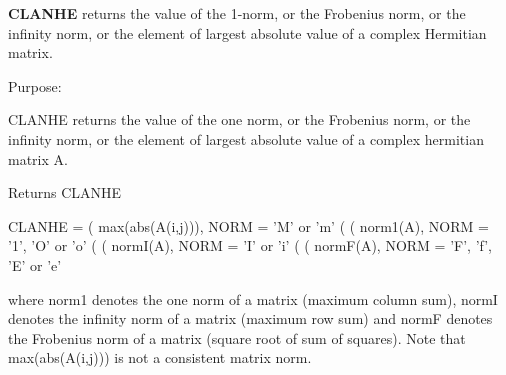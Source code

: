 {\bfseries C\+L\+A\+N\+H\+E} returns the value of the 1-\/norm, or the Frobenius norm, or the infinity norm, or the element of largest absolute value of a complex Hermitian matrix. 

 \begin{DoxyParagraph}{Purpose\+: }
\begin{DoxyVerb} CLANHE  returns the value of the one norm,  or the Frobenius norm, or
 the  infinity norm,  or the  element of  largest absolute value  of a
 complex hermitian matrix A.\end{DoxyVerb}

\end{DoxyParagraph}
\begin{DoxyReturn}{Returns}
C\+L\+A\+N\+H\+E \begin{DoxyVerb}    CLANHE = ( max(abs(A(i,j))), NORM = 'M' or 'm'
             (
             ( norm1(A),         NORM = '1', 'O' or 'o'
             (
             ( normI(A),         NORM = 'I' or 'i'
             (
             ( normF(A),         NORM = 'F', 'f', 'E' or 'e'

 where  norm1  denotes the  one norm of a matrix (maximum column sum),
 normI  denotes the  infinity norm  of a matrix  (maximum row sum) and
 normF  denotes the  Frobenius norm of a matrix (square root of sum of
 squares).  Note that  max(abs(A(i,j)))  is not a consistent matrix norm.\end{DoxyVerb}
 
\end{DoxyReturn}


